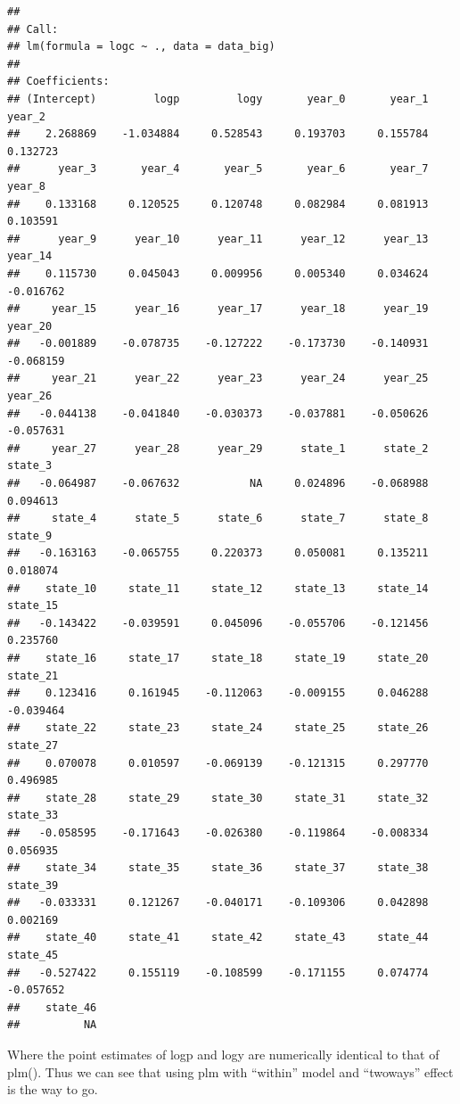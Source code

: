 \documentclass[
  a4paper,
]{article}
\begin{document}
\begin{verbatim}
## 
## Call:
## lm(formula = logc ~ ., data = data_big)
## 
## Coefficients:
## (Intercept)         logp         logy       year_0       year_1       year_2  
##    2.268869    -1.034884     0.528543     0.193703     0.155784     0.132723  
##      year_3       year_4       year_5       year_6       year_7       year_8  
##    0.133168     0.120525     0.120748     0.082984     0.081913     0.103591  
##      year_9      year_10      year_11      year_12      year_13      year_14  
##    0.115730     0.045043     0.009956     0.005340     0.034624    -0.016762  
##     year_15      year_16      year_17      year_18      year_19      year_20  
##   -0.001889    -0.078735    -0.127222    -0.173730    -0.140931    -0.068159  
##     year_21      year_22      year_23      year_24      year_25      year_26  
##   -0.044138    -0.041840    -0.030373    -0.037881    -0.050626    -0.057631  
##     year_27      year_28      year_29      state_1      state_2      state_3  
##   -0.064987    -0.067632           NA     0.024896    -0.068988     0.094613  
##     state_4      state_5      state_6      state_7      state_8      state_9  
##   -0.163163    -0.065755     0.220373     0.050081     0.135211     0.018074  
##    state_10     state_11     state_12     state_13     state_14     state_15  
##   -0.143422    -0.039591     0.045096    -0.055706    -0.121456     0.235760  
##    state_16     state_17     state_18     state_19     state_20     state_21  
##    0.123416     0.161945    -0.112063    -0.009155     0.046288    -0.039464  
##    state_22     state_23     state_24     state_25     state_26     state_27  
##    0.070078     0.010597    -0.069139    -0.121315     0.297770     0.496985  
##    state_28     state_29     state_30     state_31     state_32     state_33  
##   -0.058595    -0.171643    -0.026380    -0.119864    -0.008334     0.056935  
##    state_34     state_35     state_36     state_37     state_38     state_39  
##   -0.033331     0.121267    -0.040171    -0.109306     0.042898     0.002169  
##    state_40     state_41     state_42     state_43     state_44     state_45  
##   -0.527422     0.155119    -0.108599    -0.171155     0.074774    -0.057652  
##    state_46  
##          NA
\end{verbatim}

Where the point estimates of logp and logy are numerically identical to
that of plm(). Thus we can see that using plm with ``within'' model and
``twoways'' effect is the way to go.
\end{document}
